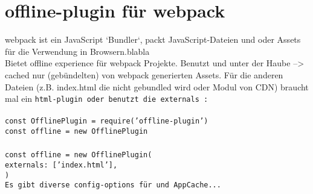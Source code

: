 \section{offline-plugin für webpack}
webpack ist ein JavaScript `Bundler`, packt JavaScript-Dateien und oder \gls{Assets} für die Verwendung in Browsern.blabla\\
Bietet offline experience für webpack Projekte. Benutzt  und  unter der Haube --> cached nur (gebündelten) von webpack generierten \gls{Assets}. Für die anderen Dateien (z.B. index.html die nicht gebundled wird oder Modul von CDN) braucht mal ein \tt{html-plugin} oder benutzt die \tt{externals} :\\\\
\tt{const OfflinePlugin = require('offline-plugin')\\
  const offline = new OfflinePlugin\\\\
  const offline = new OfflinePlugin({\\
    externals: ['index.html'],\\
    })}\\
Es gibt diverse config-options für  und AppCache...~\cite{webpack-gh}
